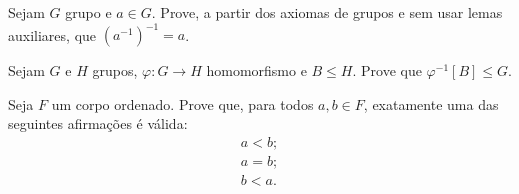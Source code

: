 \begin{exercise}
Sejam $G$ grupo e $a \in G$. Prove, a partir dos axiomas de grupos e sem usar lemas auxiliares, que $\left(a^{-1}\right)^{-1} = a$.
\end{exercise}

\begin{exercise}
%
Sejam $G$ e $H$ grupos, $\varphi: G \to H$ homomorfismo e $B \le H$. Prove que $\varphi^{-1}[B] \le G$.
\end{exercise}

\begin{exercise}
Seja $F$ um corpo ordenado. Prove que, para todos $a, b \in F$, exatamente uma das seguintes afirmações é válida:
%
\begin{gather*}
a < b; \\ a = b; \\ b < a.
\end{gather*}
\end{exercise}